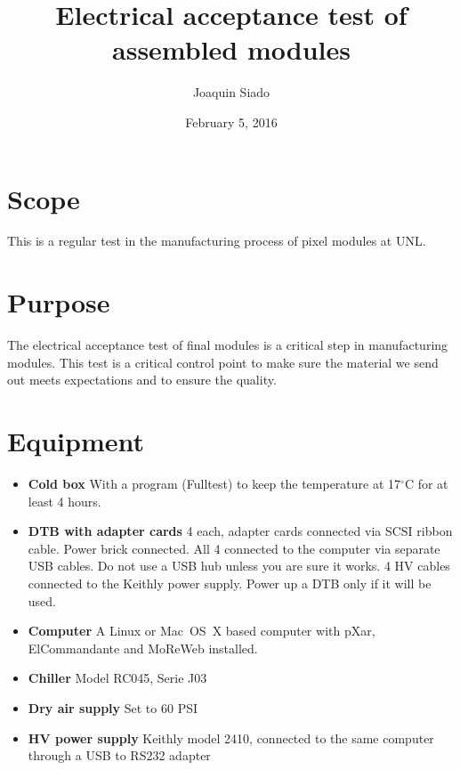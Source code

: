 \documentclass[12pt]{unlsilabsop}
\title{Electrical acceptance test of assembled modules}
\date{February 5, 2016}
\author{Joaquin Siado}
\begin{document}
\maketitle

\section{Scope}
This is a regular test in the manufacturing process of pixel modules at UNL.

\section{Purpose}
The electrical acceptance test of final modules is a critical step in manufacturing modules. This test is a critical control point to make sure the material we send out meets expectations and to ensure the quality.



\section{Equipment}

\begin{itemize}
\item \textbf{Cold box}  With a program (Fulltest) to keep the temperature at 17$^\circ$C for at least 4 hours.
\item \textbf{DTB with adapter cards} 4 each, adapter cards connected via SCSI ribbon cable. Power brick connected. All 4 connected to the computer via separate USB cables. Do not use a USB hub unless you are sure it works. 4 HV cables connected to the Keithly power supply. Power up a DTB only if it will be used.
\item \textbf{Computer} A Linux or Mac~OS~X based computer with pXar, ElCommandante and MoReWeb installed.
\item \textbf{Chiller} Model RC045, Serie J03
\item \textbf{Dry air supply} Set to 60 PSI
\item \textbf{HV power supply} Keithly model 2410, connected to the same computer through a USB to RS232 adapter
\end{itemize}
\end{document}
